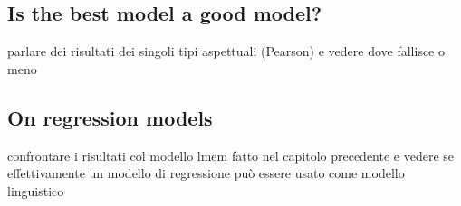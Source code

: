 \subsection{Is the best model a good model?} 

parlare dei risultati dei singoli tipi aspettuali (Pearson) e vedere dove fallisce o meno


\subsection{On regression models} 

confrontare i risultati col modello lmem fatto nel capitolo precedente e vedere se effettivamente un modello di regressione può essere usato come modello linguistico
